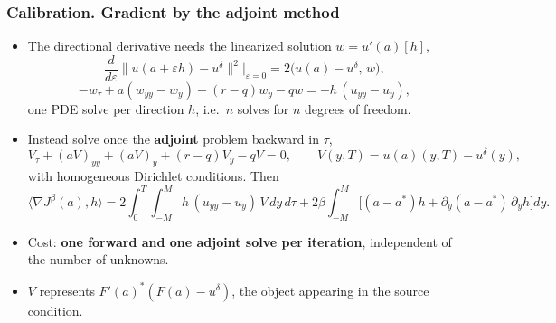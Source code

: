\begin{frame}
\frametitle{Calibration. Gradient by the adjoint method}
\begin{scriptsize}
\begin{itemize}
\item The directional derivative needs the linearized solution $w = u'(a)[h]$,
\begin{equation*}
    \frac{d}{d\varepsilon}\|u(a+\varepsilon h) - u^\delta\|^2\Big|_{\varepsilon=0}
    = 2\bigl(u(a) - u^\delta,\, w\bigr),
\end{equation*}
\begin{equation*}
    -w_\tau + a(w_{yy} - w_y) - (r-q) w_y - q w = -h\,(u_{yy} - u_y),
\end{equation*}
one PDE solve per direction $h$, i.e.\ $n$ solves for $n$ degrees of freedom.

\item Instead solve once the \textbf{adjoint} problem backward in $\tau$,
\begin{equation*}
    V_\tau + (aV)_{yy} + (aV)_y + (r-q)V_y - qV = 0,
    \qquad V(y, T) = u(a)(y, T) - u^\delta(y),
\end{equation*}
with homogeneous Dirichlet conditions. Then
\begin{equation*}
    \langle \nabla J^\beta(a), h \rangle
    = 2\int_0^{T}\!\!\int_{-M}^{M} h\,(u_{yy}-u_y)\,V\,dy\,d\tau
      + 2\beta\int_{-M}^{M}\bigl[(a-a^*)h + \partial_y(a-a^*)\,\partial_y h\bigr]dy.
\end{equation*}

\item Cost: \textbf{one forward and one adjoint solve per iteration},
independent of the number of unknowns.
\item $V$ represents $F'(a)^*(F(a) - u^\delta)$, the object appearing in the source condition.
\end{itemize}
\end{scriptsize}
\end{frame}

